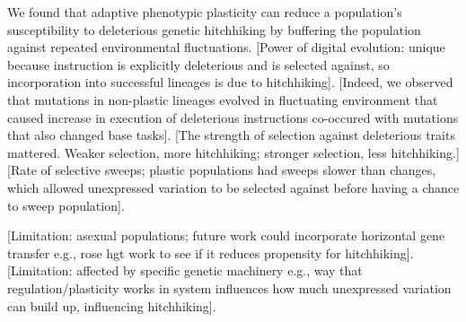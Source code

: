 We found that adaptive phenotypic plasticity can reduce a population's susceptibility to deleterious genetic hitchhiking by buffering the population against repeated environmental fluctuations.
[Power of digital evolution: unique because instruction is explicitly deleterious and is selected against, so incorporation into successful lineages is due to hitchhiking].
[Indeed, we observed that mutations in non-plastic lineages evolved in fluctuating environment that caused increase in execution of deleterious instructions co-occured with mutations that also changed base tasks].
[The strength of selection against deleterious traits mattered. Weaker selection, more hitchhiking; stronger selection, less hitchhiking.]
[Rate of selective sweeps; plastic populations had sweeps slower than changes, which allowed unexpressed variation to be selected against before having a chance to sweep population].

[Limitation: asexual populations; future work could incorporate horizontal gene transfer e.g., rose hgt work to see if it reduces propensity for hitchhiking].
[Limitation: affected by specific genetic machinery e.g., way that regulation/plasticity works in system influences how much unexpressed variation can build up, influencing hitchhiking].





